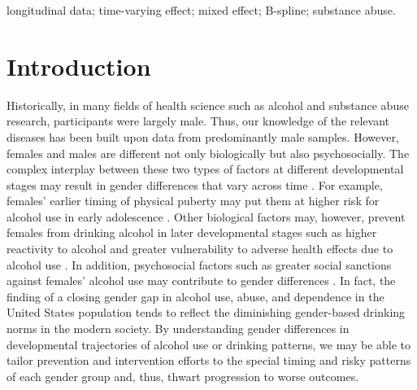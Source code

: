 \begin{frontmatter}
\begin{keyword}
longitudinal data; time-varying effect; mixed effect; B-spline; substance abuse.
\end{keyword}
\end{frontmatter}

\section{Introduction} 
Historically, in many fields of health
science such as alcohol and substance abuse research, participants
were largely male. Thus, our knowledge of the relevant diseases
has been built upon data from predominantly male samples. However,
females and males are different not only biologically but also
psychosocially. The complex interplay between these two types of
factors at different developmental stages may result in gender
differences that vary across time \cite{buu14,buu15}. For example,
females' earlier timing of physical puberty may put them at higher
risk for alcohol use in early adolescence \cite{wichstrom01}.
Other biological factors may, however, prevent females from
drinking alcohol in later developmental stages such as higher
reactivity to alcohol and greater vulnerability to adverse health
effects due to alcohol use \cite{nolen04}. In addition,
psychosocial factors such as greater social sanctions against
females' alcohol use may contribute to gender differences
\cite{nolen04}. In fact, the finding of a closing gender gap in
alcohol use, abuse, and dependence in the United States population
\cite{keyes08} tends to reflect the diminishing gender-based
drinking norms in the modern society. By understanding gender
differences in developmental trajectories of alcohol use or
drinking patterns, we may be able to tailor prevention and
intervention efforts to the special timing and risky patterns of
each gender group and, thus, thwart progression to worse outcomes.

